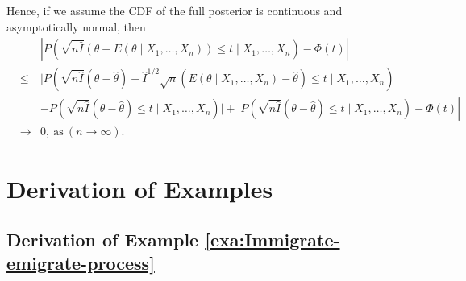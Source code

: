  Hence, {{} } {if we assume the CDF of
the full posterior is continuous and asymptotically normal, then 
\begin{eqnarray*}
 &  & \left|P\left(\sqrt{n\hat{I}}\left(\theta-E\left(\theta\mid X_{1},\ldots,X_{n}\right)\right)\le t\mid X_{1},\ldots,X_{n}\right)-\Phi\left(t\right)\right|\\
 & \le & \Bigg|P\left(\sqrt{n\hat{I}}\left(\theta-\hat{\theta}\right)+\hat{I}^{1/2}\sqrt{n}\left(E\left(\theta\mid X_{1},\ldots,X_{n}\right)-\hat{\theta}\right)\le t\mid X_{1},\ldots,X_{n}\right)\\
 &  & -P\left(\sqrt{n\hat{I}}\left(\theta-\hat{\theta}\right)\le t\mid X_{1},\ldots,X_{n}\right)\Bigg|+\left|P\left(\sqrt{n\hat{I}}\left(\theta-\hat{\theta}\right)\le t\mid X_{1},\ldots,X_{n}\right)-\Phi\left(t\right)\right|\\
 & \rightarrow & 0,\mathrm{\: as\:}\left(n\rightarrow\infty\right).
\end{eqnarray*}
}


\section{Derivation of Examples}


\subsection{\label{sub:Derivation-of-Example-1}Derivation of Example \ref{exa:Immigrate-emigrate-process}}


